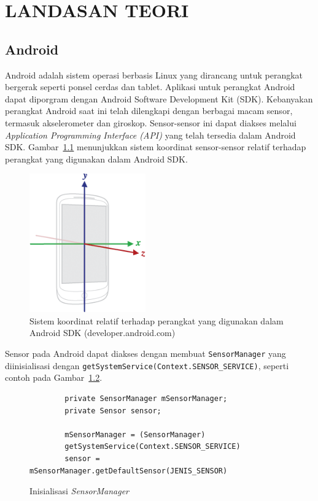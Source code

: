 \chapter{LANDASAN TEORI}

\section{Android}
Android adalah sistem operasi berbasis Linux yang dirancang untuk perangkat bergerak seperti ponsel cerdas dan tablet. Aplikasi untuk perangkat Android dapat diporgram dengan Android Software Development Kit (SDK). Kebanyakan perangkat Android saat ini telah dilengkapi dengan berbagai macam sensor, termasuk akselerometer dan giroskop. Sensor-sensor ini dapat diakses melalui \textit{Application Programming Interface (API)} yang telah tersedia dalam Android SDK\@. Gambar~\ref{gambar:koordinat-sensor-android} menunjukkan sistem koordinat sensor-sensor relatif terhadap perangkat yang digunakan dalam Android SDK\@.

\begin{figure}[h!]
    \centering
    \includegraphics[width=5cm]{gambar/landasan-teori/axis_device.png}
    \caption{Sistem koordinat relatif terhadap perangkat yang digunakan dalam Android SDK (developer.android.com)}
    \label{gambar:koordinat-sensor-android}
\end{figure}

Sensor pada Android dapat diakses dengan membuat \texttt{SensorManager} yang diinisialisasi dengan \texttt{getSystemService(Context.SENSOR_SERVICE)}, seperti contoh pada Gambar~\ref{listing:teori-inisialisasi-sensormanager}.

\begin{figure}[h]
    \begin{verbatim}
        private SensorManager mSensorManager;
        private Sensor sensor;

        mSensorManager = (SensorManager)
        getSystemService(Context.SENSOR_SERVICE)
        sensor = mSensorManager.getDefaultSensor(JENIS_SENSOR)
    \end{verbatim}
    \caption{Inisialisasi \textit{SensorManager}}
    \label{listing:teori-inisialisasi-sensormanager}
\end{figure}


